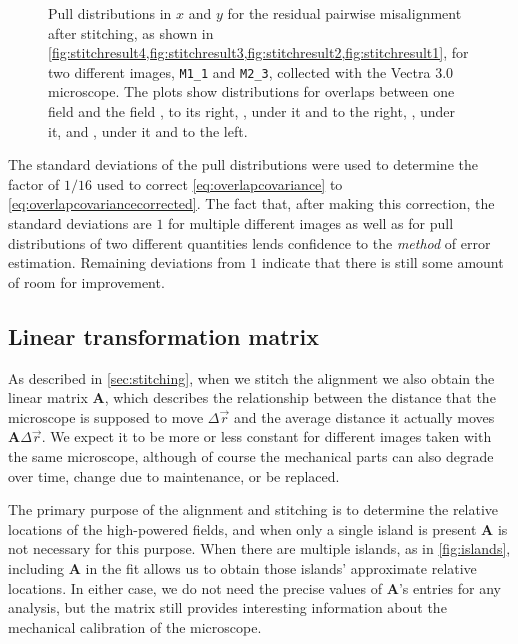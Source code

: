 \documentclass{article}
\newcommand{\matrixbold}[1]{\mathbf{#1}}
\newcommand{\M}[2]{\texttt{M#1\_#2}}
\begin{document}
\begin{figure}[ht]
\begin{subfigure}{0.24\linewidth}
		\caption{}
		\label{fig:stitchpull12}
	\end{subfigure}
	\caption{Pull distributions in $x$ and $y$ for the residual pairwise misalignment after stitching, as shown in \cref{fig:stitchresult4,fig:stitchresult3,fig:stitchresult2,fig:stitchresult1}, for two different images, \M11 and \M23, collected with the Vectra 3.0 microscope.  The plots show distributions for overlaps between one field and the field ,  to its right, ,  under it and to the right, ,   under it, and ,   under it and to the left.}
	\label{fig:stitchpulls}
\end{figure}

The standard deviations of the pull distributions were used to determine the factor of $1/16$ used to correct \cref{eq:overlapcovariance} to \cref{eq:overlapcovariancecorrected}.  The fact that, after making this correction, the standard deviations are $1$ for multiple different images as well as for pull distributions of two different quantities lends confidence to the \emph{method} of error estimation.  Remaining deviations from $1$ indicate that there is still some amount of room for improvement.

\subsection{Linear transformation matrix}

As described in \cref{sec:stitching}, when we stitch the alignment we also obtain the linear matrix $\matrixbold{A}$, which describes the relationship between the distance that the microscope is supposed to move $\Delta\vec{r}$ and the average distance it actually moves $\matrixbold{A}\Delta\vec{r}$.  We expect it to be more or less constant for different images taken with the same microscope, although of course the mechanical parts can also degrade over time, change due to maintenance, or be replaced.

The primary purpose of the alignment and stitching is to determine the relative locations of the high-powered fields, and when only a single island is present $\matrixbold{A}$ is not necessary for this purpose.  When there are multiple islands, as in \cref{fig:islands}, including $\matrixbold{A}$ in the fit allows us to obtain those islands' approximate relative locations.  In either case, we do not need the precise values of $\matrixbold{A}$'s entries for any analysis, but the matrix still provides interesting information about the mechanical calibration of the microscope.
\end{document}
